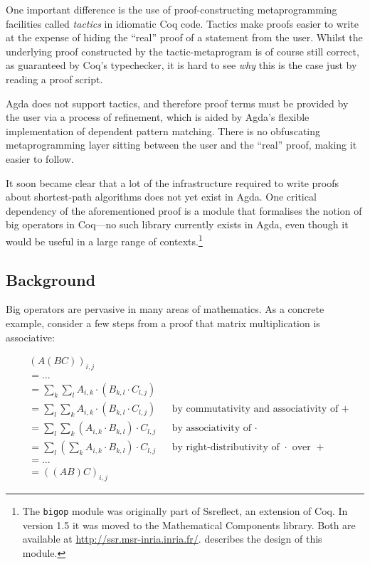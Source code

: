 \documentclass[a4paper]{scrartcl}
\begin{document}
One important difference is the use of proof-constructing metaprogramming facilities called \emph{tactics} in idiomatic Coq code.
Tactics make proofs easier to write at the expense of hiding the \enquote{real} proof of a statement from the user.
Whilst the underlying proof constructed by the tactic-metaprogram is of course still correct, as guaranteed by Coq's typechecker, it is hard to see \emph{why} this is the case just by reading a proof script.

Agda does not support tactics, and therefore proof terms must be provided by the user via a process of refinement, which is aided by Agda's flexible implementation of dependent pattern matching. There is no obfuscating metaprogramming layer sitting between the user and the \enquote{real} proof, making it easier to follow.

It soon became clear that a lot of the infrastructure required to write proofs about shortest-path algorithms does not yet exist in Agda.
One critical dependency of the aforementioned proof is a module that formalises the notion of big operators in Coq---no such library currently exists in Agda, even though it would be useful in a large range of contexts.\footnote{The \texttt{bigop} module was originally part of Ssreflect, an extension of Coq. In version 1.5 it was moved to the Mathematical Components library. Both are available at \url{http://ssr.msr-inria.inria.fr/}. \autocite{bertot_canonical_2008} describes the design of this module.}

\subsection{Background}

Big operators are pervasive in many areas of mathematics. As a concrete example, consider a few steps from a proof that matrix multiplication is associative:

\begin{align*}
&\left(A \left(B C\right)\right)_{i,j} \\
&= \dots \\
&= \sum_k \sum_l  A_{i,k} \cdot \left( B_{k,l} \cdot C_{l,j} \right) \\
&= \sum_l \sum_k  A_{i,k} \cdot \left( B_{k,l} \cdot C_{l,j} \right)
  && \text{by commutativity and associativity of \(+\)} \\
&= \sum_l \sum_k \left( A_{i,k} \cdot B_{k,l} \right) \cdot C_{l,j}
  && \text{by associativity of \(\cdot\)} \\
&= \sum_l \left( \sum_k A_{i,k} \cdot B_{k,l} \right) \cdot C_{l,j}
  && \text{by right-distributivity of \(\cdot\) over \(+\)} \\
&= \dots \\
&= \left( \left( A  B \right) C\right)_{i,j}
\end{align*}
\end{document}
